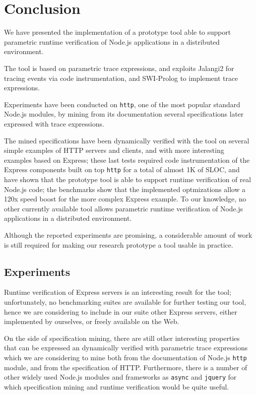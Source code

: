 \section{Conclusion}
\label{sec:conclu}

We have presented the implementation of a prototype tool able to support
parametric runtime verification of Node.js applications in a distributed environment.

The tool is based on parametric trace expressions, and exploits Jalangi2 for tracing events via code instrumentation, and SWI-Prolog to
implement trace expressions.

Experiments have been conducted on \lstinline{http}, one of the most popular standard Node.js modules,
by mining from its documentation several specifications later expressed with trace expressions.

The mined specifications have been dynamically verified with the tool on several simple examples of HTTP servers and clients,
and with more interesting examples based on Express; these last tests required code instrumentation of the Express components
built on top \lstinline{http} for a total of almost 1K of SLOC, and have shown that the prototype tool is able to support
runtime verification of real Node.js code; the benchmarks show that the implemented optmizations allow a 120x speed boost for the more
complex Express example.
To our knowledge, no other currently available tool allows parametric runtime verification of Node.js applications in a distributed environment.

Although the reported experiments are promising, a considerable amount of work is still required for making our research prototype a tool usable in practice.

\subsection{Experiments}
Runtime verification of Express servers is an interesting result for the tool; unfortunately,
no benchmarking suites are available for further testing our tool, hence we are
considering to include in our suite other Express servers, either implemented by ourselves,
or freely available on the Web.

On the side of specification mining, there are still other interesting properties that can be expressed an dynamically
verified with parametric trace expressions which we are considering to mine both from the documentation of Node.js
\lstinline{http} module, and from the specification of HTTP. Furthermore, there is a number of other widely used Node.js
modules and frameworks as \lstinline{async} and \lstinline{jquery} for which specification mining and runtime
verification would be quite useful.

